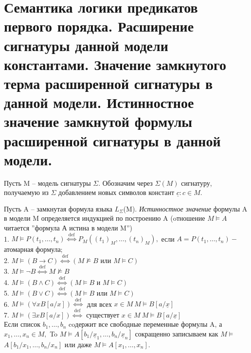 \section{Семантика логики предикатов первого порядка. Расширение сигнатуры
данной модели константами. Значение замкнутого терма расширенной
сигнатуры в данной модели. Истинностное значение замкнутой формулы
расширенной сигнатуры в данной модели.}

Пусть M -- модель сигнатуры $\Sigma$. Обозначим через $ \Sigma(M)$ сигнатуру, получаемую из $  \Sigma$ добавлением новых символов констант ${\underline {c} : c \in M. \label{formula5} } $
 
 
\begin{definition}
Пусть A -- замкнутая формула языка $L_{\Sigma }$(M). \textit{Истинностное значение} формулы A в модели M определяется индукцией по построению A (oтношение $ M \vDash A $ читается ''формула А истина в модели M'') \label{formula6}  \\
1. $M \vDash P\left(t_{1}, \ldots, t_{n}\right) \stackrel{\text { def }}{\Longleftrightarrow} P_{M}\left(\left(t_{1}\right)_{M}, \ldots,\left(t_{n}\right)_{M}\right),$ если $A=P\left(t_{1}, \ldots, t_{n}\right)-$
атомарная формула;\\
2. $M \vDash(B \rightarrow C) \stackrel{\text { def }}{\Longleftrightarrow}(M \nvDash B \text { или } M \vDash C)$ \\
3. $M \vDash \neg B \stackrel{\text { def }}{\Longleftrightarrow} M \nvDash B$ \\
4. $M \vDash(B \wedge C) \stackrel{\text { def }}{\Longleftrightarrow}\left(M \vDash B \text{ и } M \vDash C\right)$\\
5. $M \vDash(B \vee C) \stackrel{\text { def }}{\Longleftrightarrow}(M \vDash B \text { или } M \vDash C)$ \\
6. $M \vDash(\forall x B[a / x]) \stackrel{\text { def }}{\Longleftrightarrow}$ для всех $x \in M \ M \vDash B[a / \underline{x}]$ \\
7. $M \vDash(\exists x B[a / x]) \stackrel{\text { def }}{\Longleftrightarrow}$ существует $x \in M \ M \vDash B[a / \underline{x}]$ \\
Если список $b_{1}, \ldots , b_{n}  $ coдержит все свободные переменные формулы A, а
$x_{1}, \ldots, x_{n} \in M,$ To $M \vDash A\left[b_{1} / \underline{x}_{1}, \ldots, b_{n} / \underline{x}_{n}\right]$ сокращенно записываем как $M \vDash$
$A\left[b_{1} / x_{1}, \ldots, b_{n} / x_{n}\right]$ или даже $M \vDash A\left[x_{1}, \ldots, x_{n}\right]$.

\end{definition}
